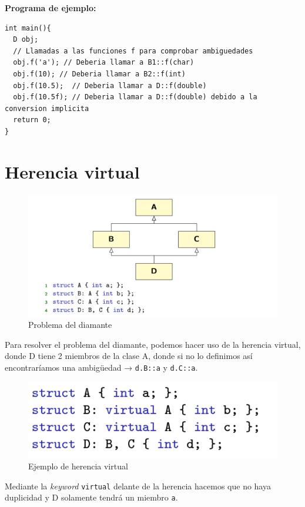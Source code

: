 \textbf{\large{Programa de ejemplo:}}
\begin{center}
	\begin{lstlisting}[frame=single]
int main(){
  D obj;
  // Llamadas a las funciones f para comprobar ambiguedades
  obj.f('a'); // Deberia llamar a B1::f(char)
  obj.f(10); // Deberia llamar a B2::f(int)
  obj.f(10.5);  // Deberia llamar a D::f(double)
  obj.f(10.5f); // Deberia llamar a D::f(double) debido a la conversion implicita
  return 0;
}
	\end{lstlisting}
\end{center}

\section{Herencia virtual}
\begin{center}
	\begin{figure}[h]
	\includegraphics[width=\textwidth]{Imagenes/gen9.png}
	\caption{Problema del diamante}
\end{figure}
\end{center}
Para resolver el problema del diamante, podemos hacer uso de la herencia virtual, donde D tiene 2 miembros de la clase A, donde si no lo definimos así encontraríamos una ambigüedad → \texttt{d.B::a} y \texttt{d.C::a}.  
\begin{center}
	\begin{figure}[h]
	\includegraphics[width=\textwidth]{Imagenes/gen10.png}
	\caption{Ejemplo de herencia virtual}
\end{figure}
\end{center}
Mediante la \textit{keyword} \texttt{virtual} delante de la herencia hacemos que no haya duplicidad y D solamente tendrá un miembro \texttt{a}.

